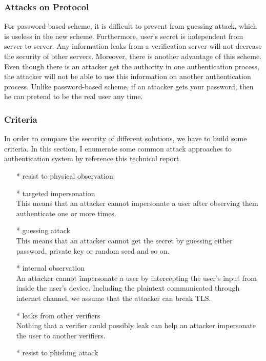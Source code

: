 \begin{CJK}{Bg5}{bsmi}
\subsubsection{Attacks on Protocol}

For password-based scheme, it is difficult to prevent from guessing attack, which is useless in the new scheme. Furthermore, user's secret is independent from server to server. Any information leaks from a verification server will not decrease the security of other servers. Moreover, there is another advantage of this scheme. Even though there is an attacker get the authority in one authentication process, the attacker will not be able to use this information on another authentication process. Unlike password-based scheme, if an attacker gets your password, then he can pretend to be the real user any time.

\subsubsection{Criteria}

In order to compare the security of different solutions, we have to build some criteria. In this section, I enumerate some common attack approaches to authentication system by reference this technical report\cite{password-extended}.
\begin{enumerate}
\item[*] resist to physical observation
\item[*] targeted impersonation
\\This means that an attacker cannot impersonate a user after observing them authenticate one or more times.
\item[*] guessing attack
\\This means that an attacker cannot get the secret by guessing either password, private key or random seed and so on.
\item[*] internal observation
\\An attacker cannot impersonate a user by intercepting the user's input from inside the user's device. Including the plaintext communicated through internet channel, we assume that the attacker can break TLS.
\item[*] leaks from other verifiers
\\Nothing that a verifier could possibly leak can help an attacker impersonate the user to another verifiers.
\item[*] resist to phishing attack
\end{enumerate}


\end{CJK}
